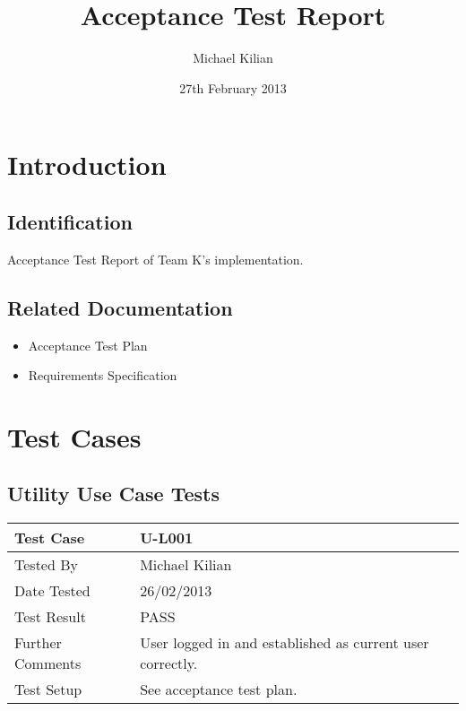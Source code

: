 \documentclass{l3deliverable}
\title{Acceptance Test Report}
\author{
  Michael Kilian \\
}
\date{27th February 2013}
\begin{document}

\maketitle

\tableofcontents

\newpage


\section{Introduction}

\subsection{Identification}
Acceptance Test Report of Team K's implementation.

\subsection{Related Documentation}
\begin{itemize}
\item{Acceptance Test Plan}
\item{Requirements Specification}
\end{itemize}


\section{Test Cases}


\subsection{Utility Use Case Tests}
\begin{tabular}{lp{10cm}}
\hline 
\textbf{Test Case} & U-L001\tabularnewline
\hline 
\hline 
Tested By & Michael Kilian\tabularnewline
\hline 
Date Tested & 26/02/2013\tabularnewline
\hline 
Test Result & PASS\tabularnewline
\hline
Further Comments & User logged in and established as current user correctly. \tabularnewline
\hline
Test Setup & See acceptance test plan. \tabularnewline
\hline
\end{tabular}\\
\end{document}
